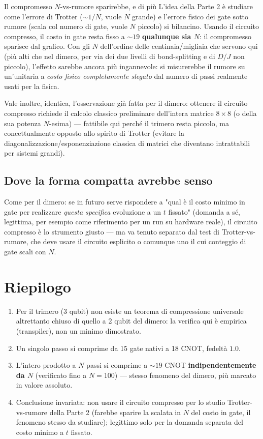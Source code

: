 \documentclass[11pt,a4paper]{article}
\begin{document}
\begin{warnbox}{Il compromesso $N$-vs-rumore sparirebbe, e di più}
L'idea della Parte 2 è studiare come l'errore di Trotter ($\sim1/N$,
vuole $N$ grande) e l'errore fisico dei gate sotto rumore (scala col
numero di gate, vuole $N$ piccolo) si bilancino. Usando il circuito
compresso, il costo in gate resta fisso a $\sim19$ \textbf{qualunque sia
$N$}: il compromesso sparisce dal grafico. Con gli $N$ dell'ordine delle
centinaia/migliaia che servono qui (più alti che nel dimero, per via dei
due livelli di bond-splitting e di $D/J$ non piccolo), l'effetto sarebbe
ancora più ingannevole: si misurerebbe il rumore su un'unitaria a
\emph{costo fisico completamente slegato} dal numero di passi realmente
usati per la fisica.
\end{warnbox}

Vale inoltre, identica, l'osservazione già fatta per il dimero: ottenere
il circuito compresso richiede il calcolo classico preliminare
dell'intera matrice $8\times8$ (o della sua potenza $N$-esima) --- fattibile
qui perché il trimero resta piccolo, ma concettualmente opposto allo
spirito di Trotter (evitare la diagonalizzazione/esponenziazione
classica di matrici che diventano intrattabili per sistemi grandi).

\subsection*{Dove la forma compatta avrebbe senso}

Come per il dimero: se in futuro serve rispondere a "qual è il costo
minimo in gate per realizzare \emph{questa specifica} evoluzione a un $t$
fissato" (domanda a sé, legittima, per esempio come riferimento per un
run su hardware reale), il circuito compresso è lo strumento giusto ---
ma va tenuto separato dal test di Trotter-vs-rumore, che deve usare il
circuito esplicito o comunque uno il cui conteggio di gate scali con $N$.

\section{Riepilogo}

\begin{enumerate}[leftmargin=1.4em,itemsep=0.3em]
\item Per il trimero (3 qubit) non esiste un teorema di compressione
universale altrettanto chiuso di quello a 2 qubit del dimero: la verifica
qui è empirica (transpiler), non un minimo dimostrato.
\item Un singolo passo si comprime da 15 gate nativi a 18 CNOT, fedeltà
$1.0$.
\item L'intero prodotto a $N$ passi si comprime a $\sim19$ CNOT
\textbf{indipendentemente da $N$} (verificato fino a $N=100$) --- stesso
fenomeno del dimero, più marcato in valore assoluto.
\item Conclusione invariata: non usare il circuito compresso per lo
studio Trotter-vs-rumore della Parte 2 (farebbe sparire la scalata in $N$
del costo in gate, il fenomeno stesso da studiare); legittimo solo per la
domanda separata del costo minimo a $t$ fissato.
\end{enumerate}
\end{document}
